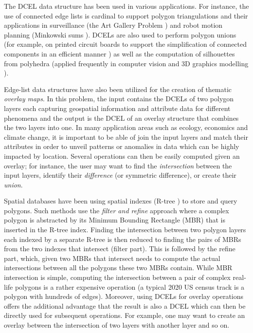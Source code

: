 The DCEL data structure has been used in various applications.
For instance, the use of connected edge lists is cardinal to support polygon triangulations and their applications in surveillance (the Art Gallery Problem
\cite{chvatal_combinatorial_1975, orourke_art_1987}) and robot motion planning (Minkowski sums \cite{berg_computational_2008, chew_convex_1993}).
DCELs are also used to perform polygon unions (for example, on printed circuit boards to support the simplification of connected components in an efficient
manner \cite{fogel_cgal_2012}) as well as the computation of silhouettes from polyhedra \cite{fogel_cgal_2012, berberich_arrangements_2010} (applied frequently
in computer vision and 3D graphics modelling \cite{boguslawski_modelling_2011}).

Edge-list data structures have also been utilized for the creation of thematic \textit{overlay maps}. In this problem, the input contains the DCELs of two
polygon layers each capturing geospatial information and attribute data for different phenomena and the output is the DCEL of an overlay structure that combines
the two layers into one.
In many application areas such as ecology, economics and climate change, it is important to be able of join the input layers and match their attributes in order
to unveil patterns or anomalies in data which can be highly impacted by location.
Several operations can then be easily computed given an overlay; for instance, the user may want to find the \textit{intersection} between the input layers,
identify their \textit{difference} (or symmetric difference), or create their \textit{union}.

Spatial databases have been using spatial indexes (R-tree \cite{guttman_r-trees_1984, beckmann_r-tree_1990}) to store and query polygons. Such methods use the \textit{filter and refine}
approach where a complex polygon is abstracted by its Minimum Bounding Rectangle (MBR) that is inserted in the R-tree index.
Finding the intersection between two polygon layers each indexed by a separate R-tree is then reduced to finding the pairs of MBRs from the two indexes that
intersect (filter part).
This is followed by the refine part, which, given two MBRs that intersect needs to compute the actual intersections between all the polygons these two MBRs
contain.
While MBR intersection is simple, computing the intersection between a pair of complex real-life polygons is a rather expensive operation (a typical 2020 US
census track is a polygon with hundreds of edges).
Moreover, using DCELs for overlay operations offers the additional advantage that the result is also a DCEL which can then be directly used for subsequent
operations.
For example, one may want to create an overlay between the intersection of two layers with another layer and so on.

